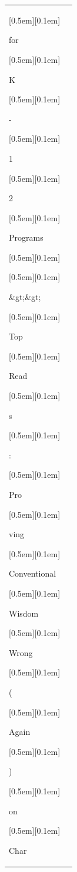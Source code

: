 \begin{table}[ht]
\begin{tabular}{@{}l p{13cm}@{}}
{\setlength{\fboxsep}{1pt}\raisebox{0pt}[0.5em][0.1em]{\colorbox{SkyBlue!55}{\strut{ for}}}}{\setlength{\fboxsep}{1pt}\raisebox{0pt}[0.5em][0.1em]{\colorbox{DarkOrchid!25}{\strut{ K}}}}{\setlength{\fboxsep}{1pt}\raisebox{0pt}[0.5em][0.1em]{\colorbox{DarkOrchid!25}{\strut{-}}}}{\setlength{\fboxsep}{1pt}\raisebox{0pt}[0.5em][0.1em]{\colorbox{SkyBlue!55}{\strut{1}}}}{\setlength{\fboxsep}{1pt}\raisebox{0pt}[0.5em][0.1em]{\colorbox{Salmon!60}{\strut{2}}}}{\setlength{\fboxsep}{1pt}\raisebox{0pt}[0.5em][0.1em]{\colorbox{Salmon!60}{\strut{ Programs}}}}{\setlength{\fboxsep}{1pt}\raisebox{0pt}[0.5em][0.1em]{\colorbox{DarkOrchid!25}{\strut{ }}}}{\setlength{\fboxsep}{1pt}\raisebox{0pt}[0.5em][0.1em]{\colorbox{SkyBlue!55}{\strut{\&gt;\&gt;}}}}{\setlength{\fboxsep}{1pt}\raisebox{0pt}[0.5em][0.1em]{\colorbox{Salmon!60}{\strut{ Top}}}}{\setlength{\fboxsep}{1pt}\raisebox{0pt}[0.5em][0.1em]{\colorbox{Salmon!60}{\strut{ Read}}}}{\setlength{\fboxsep}{1pt}\raisebox{0pt}[0.5em][0.1em]{\colorbox{Salmon!60}{\strut{s}}}}{\setlength{\fboxsep}{1pt}\raisebox{0pt}[0.5em][0.1em]{\colorbox{SkyBlue!55}{\strut{:}}}}{\setlength{\fboxsep}{1pt}\raisebox{0pt}[0.5em][0.1em]{\colorbox{DarkOrchid!25}{\strut{ Pro}}}}{\setlength{\fboxsep}{1pt}\raisebox{0pt}[0.5em][0.1em]{\colorbox{Salmon!60}{\strut{ving}}}}{\setlength{\fboxsep}{1pt}\raisebox{0pt}[0.5em][0.1em]{\colorbox{Salmon!60}{\strut{ Conventional}}}}{\setlength{\fboxsep}{1pt}\raisebox{0pt}[0.5em][0.1em]{\colorbox{Salmon!60}{\strut{ Wisdom}}}}{\setlength{\fboxsep}{1pt}\raisebox{0pt}[0.5em][0.1em]{\colorbox{Salmon!60}{\strut{ Wrong}}}}{\setlength{\fboxsep}{1pt}\raisebox{0pt}[0.5em][0.1em]{\colorbox{SkyBlue!55}{\strut{ (}}}}{\setlength{\fboxsep}{1pt}\raisebox{0pt}[0.5em][0.1em]{\colorbox{Salmon!60}{\strut{Again}}}}{\setlength{\fboxsep}{1pt}\raisebox{0pt}[0.5em][0.1em]{\colorbox{DarkOrchid!25}{\strut{)}}}}{\setlength{\fboxsep}{1pt}\raisebox{0pt}[0.5em][0.1em]{\colorbox{SkyBlue!55}{\strut{ on}}}}{\setlength{\fboxsep}{1pt}\raisebox{0pt}[0.5em][0.1em]{\colorbox{DarkOrchid!25}{\strut{ Char}}}}


\end{tabular}
\end{table}
